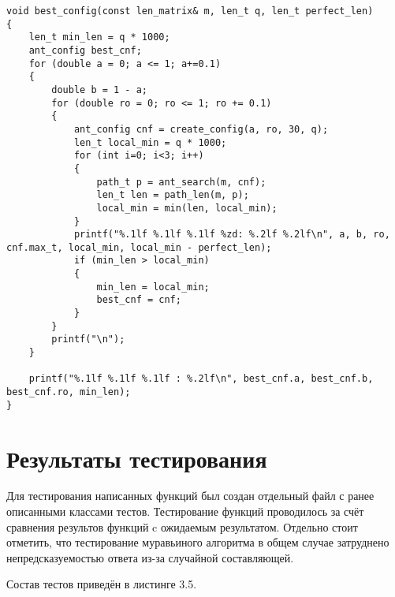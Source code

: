 \begin{lstlisting}[caption = {Функции автоматической параметризации муравьиного алгоритма}]
void best_config(const len_matrix& m, len_t q, len_t perfect_len)
{
	len_t min_len = q * 1000;
	ant_config best_cnf;
	for (double a = 0; a <= 1; a+=0.1)
	{
		double b = 1 - a;
		for (double ro = 0; ro <= 1; ro += 0.1)
		{
			ant_config cnf = create_config(a, ro, 30, q);
			len_t local_min = q * 1000;
			for (int i=0; i<3; i++)
			{
				path_t p = ant_search(m, cnf);
				len_t len = path_len(m, p);
				local_min = min(len, local_min);
			}
			printf("%.1lf %.1lf %.1lf %zd: %.2lf %.2lf\n", a, b, ro, cnf.max_t,	local_min, local_min - perfect_len);
			if (min_len > local_min)
			{
				min_len = local_min;
				best_cnf = cnf;
			}
		}
		printf("\n");
	}
	
	printf("%.1lf %.1lf %.1lf : %.2lf\n", best_cnf.a, best_cnf.b, best_cnf.ro, min_len);
}
\end{lstlisting}

\section{Результаты тестирования}
Для тестирования написанных функций был создан отдельный файл с ранее описанными классами тестов. Тестирование функций проводилось за счёт сравнения результов функций c ожидаемым результатом. Отдельно стоит отметить, что тестирование муравьиного алгоритма в общем случае затруднено непредсказуемостью ответа из-за случайной составляющей.

Состав тестов приведён в листинге 3.5.

